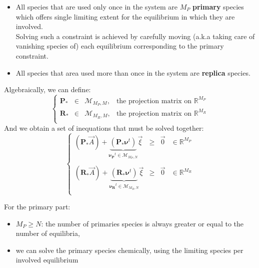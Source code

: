 \documentclass[aps,onecolumn,11pt]{revtex4}
\begin{document}
\begin{itemize}
\item All species that are used only once in the system are $M_P$ \textbf{primary} species which offers single limiting extent for the equilibrium in which they
are involved.\\
Solving such a constraint is achieved by carefully moving (a.k.a taking care of vanishing species of) each equilibrium corresponding to the primary constraint.

\item All species that area used more than once in the system are \textbf{replica} species.
\end{itemize}

Algebraically, we can define:
\begin{equation}
\left\lbrace
\begin{array}{rccl}
	\bm{P_\ast} & \in & \mathcal{M}_{M_P,M}, & \text{the projection matrix on } \mathbb{R}^{M_P}\\
	\bm{R_\ast} & \in & \mathcal{M}_{M_R,M}, & \text{the projection matrix on } \mathbb{R}^{M_R}\\
\end{array}
\right.
\end{equation}
And we obtain a set of inequations that must be solved together:
\begin{equation}
\left\lbrace
\begin{array}{rcll}
	(\bm{P_\ast}\vec{A}) + \underbrace{(\bm{P_\ast}\bm{\nu}^t)}_{\bm{\nu_P}^t \in \mathcal{M}_{M_P,N} } \vec{\xi} & \geq & \vec{0} & \in \mathbb{R}^{M_P}\\
	\\
	(\bm{R_\ast}\vec{A}) + \underbrace{(\bm{R_\ast}\bm{\nu}^t)}_{\bm{\nu_R}^t \in \mathcal{M}_{M_R,N}} \vec{\xi} & \geq & \vec{0} & \in \mathbb{R}^{M_R}\\
	
\end{array}
\right.
\end{equation}

For the primary part:
\begin{itemize}
\item $M_P\geq N$: the number of primaries species is always greater or equal to the number of equilibria,
\item we can solve the primary species chemically, using the limiting species per involved equilibrium
\end{itemize}


   
\end{document}
